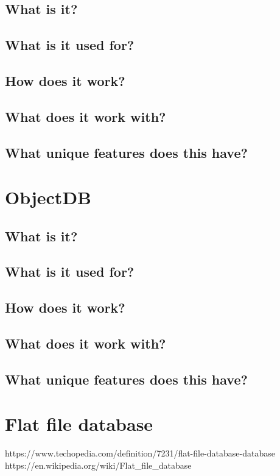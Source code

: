 \section{What is it?}

\section{What is it used for?}

\section{How does it work?}

\section{What does it work with?}

\section{What unique features does this have?}


\chapter{ObjectDB}

\section{What is it?}

\section{What is it used for?}

\section{How does it work?}

\section{What does it work with?}

\section{What unique features does this have?}


\chapter{Flat file database}
https://www.techopedia.com/definition/7231/flat-file-database-database
https://en.wikipedia.org/wiki/Flat_file_database

